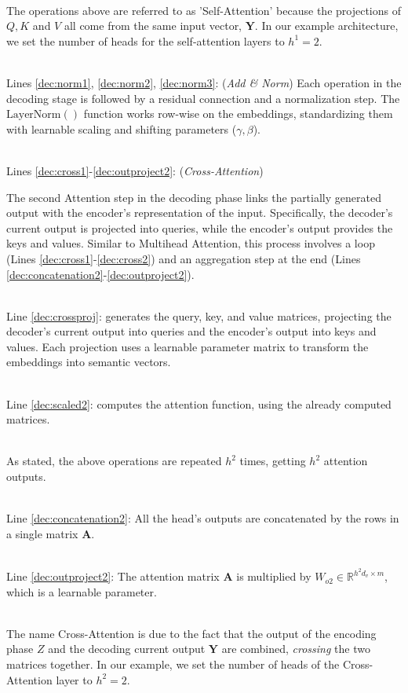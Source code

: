 \documentclass[algorithms,article,submit,pdftex,moreauthors]{Definitions/mdpi}
\begin{document}
~\\The operations above are referred to as 'Self-Attention' because the projections of $Q, K$ and $V$ all come from the same input vector, $\textbf{Y}$. In our example architecture, we set the number of heads for the self-attention layers to $h^1 = 2$.

~\\Lines \ref{dec:norm1}, \ref{dec:norm2}, \ref{dec:norm3}: (\textit{Add \& Norm})
Each operation in the decoding stage is followed by a residual connection and a normalization step. The $\text{LayerNorm}()$ function works row-wise on the embeddings, standardizing them with learnable scaling and shifting parameters ($\gamma, \beta$).

~\\Lines \ref{dec:cross1}-\ref{dec:outproject2}: (\textit{Cross-Attention})

\noindent The second Attention step in the decoding phase links the partially generated output with the encoder’s representation of the input. Specifically, the decoder’s current output is projected into queries, while the encoder’s output provides the keys and values. Similar to Multihead Attention, this process involves a loop (Lines \ref{dec:cross1}-\ref{dec:cross2}) and an aggregation step at the end (Lines \ref{dec:concatenation2}-\ref{dec:outproject2}).

~\\Line \ref{dec:crossproj}: generates the query, key, and value matrices, projecting the decoder’s current output into queries and the encoder’s output into keys and values. Each projection uses a learnable parameter matrix to transform the embeddings into semantic vectors.

~\\Line \ref{dec:scaled2}: computes the attention function, using the already computed matrices.

~\\As stated, the above operations are repeated $h^2$ times, getting $h^2$ attention outputs.

~\\Line \ref{dec:concatenation2}: All the head's outputs are concatenated by the rows in a single matrix $\textbf{A}$.

~\\Line \ref{dec:outproject2}: The attention matrix $\textbf{A}$ is multiplied by $W_{o2} \in \mathbb{R}^{h^2d_v \times m}$, which is a learnable parameter.

~\\The name Cross-Attention is due to the fact that the output of the encoding phase $Z$ and the decoding current output $\textbf{Y}$ are combined, \textit{crossing} the two matrices together. In our example, we set the number of heads of the Cross-Attention layer to $h^2 = 2$.
\end{document}
